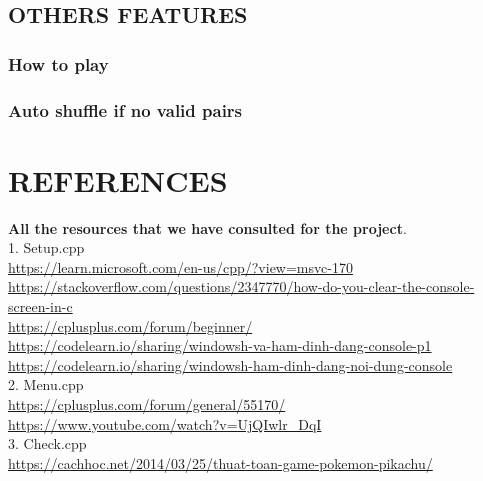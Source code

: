\documentclass[12pt,a4paper]{report}
\begin{document}
\section{OTHERS FEATURES}
\subsection{How to play}
\subsection{Auto shuffle if no valid pairs}
\chapter{REFERENCES}
{\textbf{\large All the resources that we have consulted for the project}}.\\[1.0cm]
1. Setup.cpp \\
\indent \textcolor{blue}{\href{https://learn.microsoft.com/en-us/cpp/?view=msvc-170}{https://learn.microsoft.com/en-us/cpp/?view=msvc-170}}\\[0.2cm]
\indent \textcolor{blue}{\href{https://stackoverflow.com/questions/2347770/how-do-you-clear-the-console-screen-in-c}{https://stackoverflow.com/questions/2347770/how-do-you-clear-the-console-screen-in-c}}\\[0.2cm]
\indent \textcolor{blue}{\href{https://cplusplus.com/forum/beginner/}{https://cplusplus.com/forum/beginner/}}\\[0.2cm]
\indent \textcolor{blue}{\href{https://codelearn.io/sharing/windowsh-va-ham-dinh-dang-console-p1}{https://codelearn.io/sharing/windowsh-va-ham-dinh-dang-console-p1}}\\[0.2cm]
\indent \textcolor{blue}{\href{https://codelearn.io/sharing/windowsh-ham-dinh-dang-noi-dung-console}{https://codelearn.io/sharing/windowsh-ham-dinh-dang-noi-dung-console}}\\[0.2cm]
2. Menu.cpp \\
\indent \textcolor{blue}{\href{https://cplusplus.com/forum/general/55170/}{https://cplusplus.com/forum/general/55170/}}\\[0.2cm]
\indent \textcolor{blue}{\href{https://www.youtube.com/watch?v=UjQIwlr_DqI}{https://www.youtube.com/watch?v=UjQIwlr\_DqI}}\\[0.2cm]
3. Check.cpp \\
\indent \textcolor{blue}{\href{https://cachhoc.net/2014/03/25/thuat-toan-game-pokemon-pikachu/}{https://cachhoc.net/2014/03/25/thuat-toan-game-pokemon-pikachu/}}\\[0.2cm]
\end{document}
